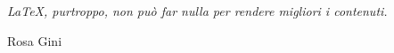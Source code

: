 \documentclass[svgnames,%
	ucs,%
	pdftex]{guitbeamer}
\begin{document}
\begin{frame}
  \itshape
	\LaTeX, purtroppo, non pu\`o far nulla per rendere migliori i contenuti.
	\begin{flushright}\upshape
		Rosa Gini
	\end{flushright}
\end{frame}
\end{document}
